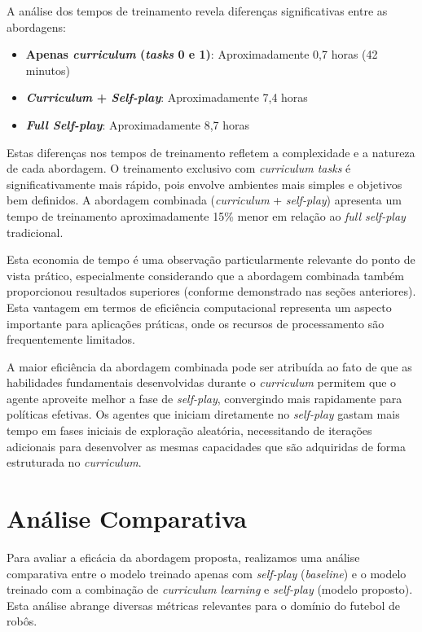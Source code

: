 A análise dos tempos de treinamento revela diferenças significativas entre as abordagens:

\begin{itemize}
    \item \textbf{Apenas \textit{curriculum} (\textit{tasks} 0 e 1)}: Aproximadamente 0,7 horas (42 minutos)
    \item \textbf{\textit{Curriculum} + \textit{Self-play}}: Aproximadamente 7,4 horas
    \item \textbf{\textit{Full Self-play}}: Aproximadamente 8,7 horas
\end{itemize}

Estas diferenças nos tempos de treinamento refletem a complexidade e a natureza de cada abordagem. O treinamento exclusivo com \textit{curriculum tasks} é significativamente mais rápido, pois envolve ambientes mais simples e objetivos bem definidos. A abordagem combinada (\textit{curriculum} + \textit{self-play}) apresenta um tempo de treinamento aproximadamente 15\% menor em relação ao \textit{full self-play} tradicional.

Esta economia de tempo é uma observação particularmente relevante do ponto de vista prático, especialmente considerando que a abordagem combinada também proporcionou resultados superiores (conforme demonstrado nas seções anteriores). Esta vantagem em termos de eficiência computacional representa um aspecto importante para aplicações práticas, onde os recursos de processamento são frequentemente limitados.

A maior eficiência da abordagem combinada pode ser atribuída ao fato de que as habilidades fundamentais desenvolvidas durante o \textit{curriculum} permitem que o agente aproveite melhor a fase de \textit{self-play}, convergindo mais rapidamente para políticas efetivas. Os agentes que iniciam diretamente no \textit{self-play} gastam mais tempo em fases iniciais de exploração aleatória, necessitando de iterações adicionais para desenvolver as mesmas capacidades que são adquiridas de forma estruturada no \textit{curriculum}.

\section{Análise Comparativa}
\label{sec:analise_comparativa}

Para avaliar a eficácia da abordagem proposta, realizamos uma análise comparativa entre o modelo treinado apenas com \textit{self-play} (\textit{baseline}) e o modelo treinado com a combinação de \textit{curriculum learning} e \textit{self-play} (modelo proposto). Esta análise abrange diversas métricas relevantes para o domínio do futebol de robôs.

